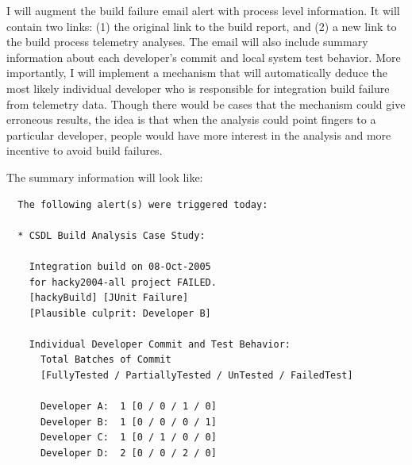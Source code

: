 I will augment the build failure email alert with process level information. It will contain two links: (1) the original link to the build report, and (2) a new link to the build process telemetry analyses. The email will also include summary information about each developer's commit and local system test behavior. More importantly, I will implement a mechanism that will automatically deduce the most likely individual developer who is responsible for integration build failure from telemetry data. Though there would be cases that the mechanism could give erroneous results, the idea is that when the analysis could point fingers to a particular developer, people would have more interest in the analysis and more incentive to avoid build failures.

The summary information will look like:

\begin{verbatim}
  The following alert(s) were triggered today:

  * CSDL Build Analysis Case Study:
  
    Integration build on 08-Oct-2005 
    for hacky2004-all project FAILED.
    [hackyBuild] [JUnit Failure] 
    [Plausible culprit: Developer B]

    Individual Developer Commit and Test Behavior: 
      Total Batches of Commit
      [FullyTested / PartiallyTested / UnTested / FailedTest]
    
      Developer A:  1 [0 / 0 / 1 / 0]
      Developer B:  1 [0 / 0 / 0 / 1]
      Developer C:  1 [0 / 1 / 0 / 0]
      Developer D:  2 [0 / 0 / 2 / 0]
\end{verbatim}







